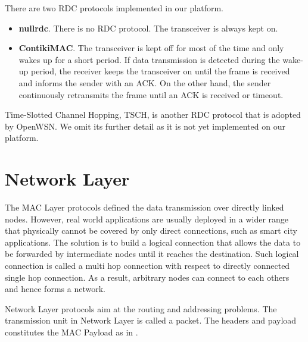 There are two RDC protocols implemented in our platform.

\begin{itemize}
\item \textbf{nullrdc}. There is no RDC protocol. The transceiver is always kept on.
\item \textbf{ContikiMAC\cite{ContikiMAC}}. The transceiver is kept off for most of the time and only wakes up for a short period. If data transmission is detected during the wake-up period, the receiver keeps the transceiver on until the frame is received and informs the sender with an ACK. On the other hand, the sender continuously retransmits the frame until an ACK is received or timeout.
\end{itemize}

Time-Slotted Channel Hopping\cite{TSCH}, TSCH, is another RDC protocol that is adopted by OpenWSN. We omit its further detail as it is not yet implemented on our platform.

\section{Network Layer} \label{Sec: Network Layer}
The MAC Layer protocols defined the data transmission over directly linked nodes. However, real world applications are usually deployed in a wider range that physically cannot be covered by only direct connections, such as smart city applications. The solution is to build a logical connection that allows the data to be forwarded by intermediate nodes until it reaches the destination. Such logical connection is called a multi hop connection with respect to directly connected single hop connection. As a result, arbitrary nodes can connect to each others and hence forms a network.

Network Layer protocols aim at the routing and addressing problems. The transmission unit in Network Layer is called a packet. The headers and payload constitutes the MAC Payload as in .

